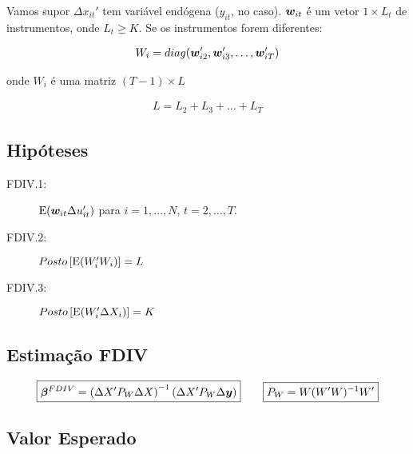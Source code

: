 \documentclass[11pt, oneside, a4paper, article]{article}
\numberwithin{equation}{section}
\begin{document}
\begin{description}
	Vamos supor $\Delta x_{it}'$ tem variável endógena ($y_{it}$, no caso).
	$\boldsymbol{w}_{it}$ é um vetor $1 \times L_{t}$ de instrumentos, onde $L_{t} \geq K$.
	Se os instrumentos forem diferentes:

	\vspace{-1 em}
	\begin{align*}
		W_{i} = diag( \boldsymbol{w}_{i2}', \boldsymbol{w}_{i3}', \dots, \boldsymbol{w}_{iT}')
	\end{align*}

	\noindent
	onde $W_{i}$ é uma matriz $( T - 1 ) \times L$

	\vspace{-1 em}
	\begin{align*}
		L = L_{2} + L_{3} + \dots + L_{T}
	\end{align*}

	\subsection{Hipóteses}

	\begin{description}
		\item[FDIV.1:] $\text{E}( \boldsymbol{w}_{it} \Delta u_{it}')$ para $i = 1, \dots, N$, $t = 2, \dots, T$.
		\item[FDIV.2:] $Posto\left[ \text{E}( W_{i}' W_{i} ) \right] = L$
		\item[FDIV.3:] $Posto\left[ \text{E}( W_{i}' \Delta X_{i} ) \right] = K$
	\end{description}

	\subsection{Estimação FDIV}

	\vspace{-1 em}
	\begin{align*}
		\boxed{
			\boldsymbol{\beta}^{FDIV} =  
			\left(
				\Delta X' P_{W} \Delta X 
			\right)^{-1}
			\left(
				\Delta X' P_{W} \Delta \boldsymbol{y}
			\right)
		}
		\qquad
		\boxed{
		P_{W} = W(W'W)^{-1}W'}
	\end{align*}

	\subsection{Valor Esperado}


\end{description}
\end{document}
